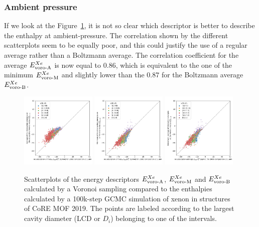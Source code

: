 \documentclass[main]{subfiles}
\begin{document}
\subsubsection{Ambient pressure}

If we look at the Figure~\ref{fgr:compa_voro_2080}, it is not so clear which descriptor is better to describe the enthalpy at ambient-pressure. The correlation shown by the different scatterplots seem to be equally poor, and this could justify the use of a regular average rather than a Boltzmann average. The correlation coefficient for the average $E_{\text{voro-A}}^{Xe}$ is now equal to $0.86$, which is equivalent to the one of the minimum $E_{\text{voro-M}}^{Xe}$ and slightly lower than the $0.87$ for the Boltzmann average $E_{\text{voro-B}}^{Xe}$. 

\begin{figure}[ht]
    \centering
      \includegraphics[width=0.32\textwidth]{figures/3-fastsim/H_Xe_2080_vs_E_voro_A_overview.jpg}
      \includegraphics[width=0.32\textwidth]{figures/3-fastsim/H_Xe_2080_vs_E_voro_M_overview.jpg}
      \includegraphics[width=0.32\textwidth]{figures/3-fastsim/H_Xe_2080_vs_E_voro_B_overview.jpg}
      \caption{Scatterplots of the energy descriptors $E_{\text{voro-A}}^{Xe}$, $E_{\text{voro-M}}^{Xe}$ and $E_{\text{voro-B}}^{Xe}$ calculated by a Voronoi sampling compared to the enthalpies calculated by a 100k-step GCMC simulation of xenon in structures of CoRE MOF 2019. The points are labeled according to the largest cavity diameter (LCD or $D_i$) belonging to one of the intervals.}\label{fgr:compa_voro_2080}
  \end{figure}
  
\end{document}
